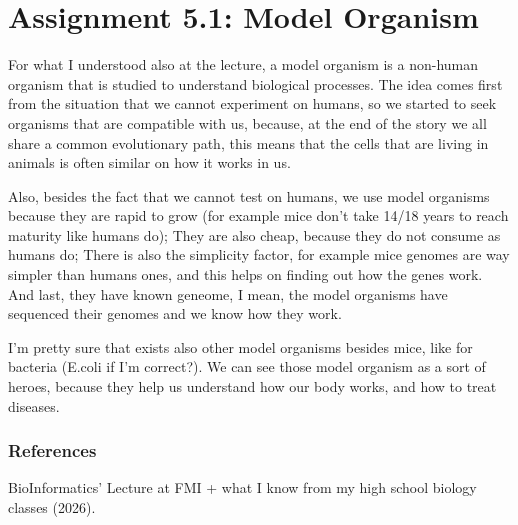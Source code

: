 \chapter{Assignment 5.1: Model Organism}

For what I understood also at the lecture, a model organism is a non-human organism that is studied to understand biological processes. 
The idea comes first from the situation that we cannot experiment on humans, 
so we started to seek organisms that are compatible with us, because, 
at the end of the story we all share a common evolutionary path, 
this means that the cells that are living in animals is often similar on how it works in us.

Also, besides the fact that we cannot test on humans, we use model organisms because they are rapid to grow (for example mice don't take 14/18 years to reach maturity like humans do);
They are also cheap, because they do not consume as humans do; There is also the simplicity factor, for example mice genomes are way simpler than humans ones,
and this helps on finding out how the genes work. And last, they have known geneome, I mean, the model organisms have sequenced their genomes and we know how they work.

I'm pretty sure that exists also other model organisms besides mice, like for bacteria (E.coli if I'm correct?).
We can see those model organism as a sort of heroes, because they help us understand how our body works, and how to treat diseases.

\vspace{0.5cm}
\subsection*{References}
BioInformatics' Lecture at FMI + what I know from my high school biology classes (2026). 
